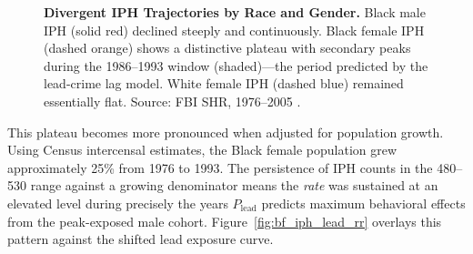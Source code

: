 \documentclass[12pt,openany]{book}
\begin{document}
\begin{figure}[H]
\caption{\textbf{Divergent IPH Trajectories by Race and Gender.} Black male IPH (solid red) declined steeply and continuously. Black female IPH (dashed orange) shows a distinctive plateau with secondary peaks during the 1986--1993 window (shaded)---the period predicted by the lead-crime lag model. White female IPH (dashed blue) remained essentially flat. Source: FBI SHR, 1976--2005 \cite{fox_zawitz2007}.}
\label{fig:iph_race_gender}
\end{figure}

This plateau becomes more pronounced when adjusted for population growth. Using Census intercensal estimates, the Black female population grew approximately 25\% from 1976 to 1993. The persistence of IPH counts in the 480--530 range against a growing denominator means the \textit{rate} was sustained at an elevated level during precisely the years $P_{\text{lead}}$ predicts maximum behavioral effects from the peak-exposed male cohort. Figure~\ref{fig:bf_iph_lead_rr} overlays this pattern against the shifted lead exposure curve.
\end{document}
